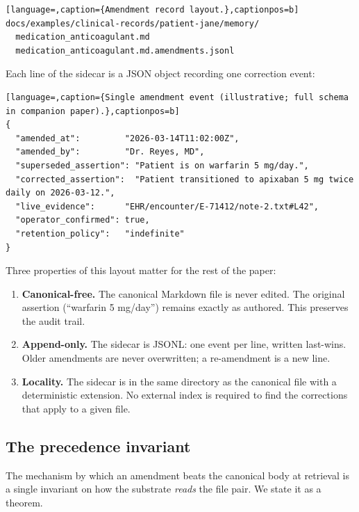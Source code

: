 \documentclass[11pt,a4paper]{article}
\begin{document}
\begin{lstlisting}[language=,caption={Amendment record layout.},captionpos=b]
docs/examples/clinical-records/patient-jane/memory/
  medication_anticoagulant.md
  medication_anticoagulant.md.amendments.jsonl
\end{lstlisting}

Each line of the sidecar is a JSON object recording one correction event:

\begin{lstlisting}[language=,caption={Single amendment event (illustrative; full schema in companion paper).},captionpos=b]
{
  "amended_at":         "2026-03-14T11:02:00Z",
  "amended_by":         "Dr. Reyes, MD",
  "superseded_assertion": "Patient is on warfarin 5 mg/day.",
  "corrected_assertion":  "Patient transitioned to apixaban 5 mg twice daily on 2026-03-12.",
  "live_evidence":      "EHR/encounter/E-71412/note-2.txt#L42",
  "operator_confirmed": true,
  "retention_policy":   "indefinite"
}
\end{lstlisting}

\noindent
Three properties of this layout matter for the rest of the paper:

\begin{enumerate}[leftmargin=2em,itemsep=2pt]
  \item \textbf{Canonical-free.} The canonical Markdown file is never edited. The
        original assertion (``warfarin 5 mg/day'') remains exactly as authored.
        This preserves the audit trail.
  \item \textbf{Append-only.} The sidecar is JSONL: one event per line, written
        last-wins. Older amendments are never overwritten; a re-amendment is a new
        line.
  \item \textbf{Locality.} The sidecar is in the same directory as the canonical
        file with a deterministic extension. No external index is required to find
        the corrections that apply to a given file.
\end{enumerate}

\subsection{The precedence invariant}
\label{sec:precedence}

\noindent
The mechanism by which an amendment beats the canonical body at retrieval is a single
invariant on how the substrate \emph{reads} the file pair. We state it as a theorem.
\end{document}
